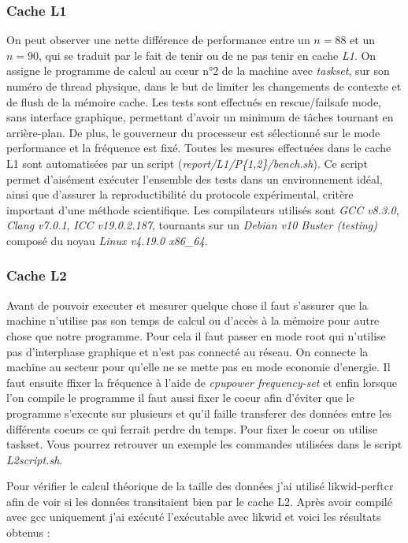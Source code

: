 \documentclass[12pt,a4paper]{article}
\begin{document}
\subsubsection{Cache L1}

On peut observer une nette différence de performance entre un $n = 88$ et un $n
= 90$, qui se traduit par le fait de tenir ou de ne pas tenir en cache
\textit{L1}. On assigne le programme de calcul au cœur n°2 de la machine avec
\textit{taskset}, sur son numéro de thread physique, dans le but de limiter les
changements de contexte et de flush de la mémoire cache. Les tests sont
effectués en rescue/failsafe mode, sans interface graphique, permettant d'avoir
un minimum de tâches tournant en arrière-plan. De plus, le gouverneur du
processeur est sélectionné sur le mode performance et la fréquence est fixé. Toutes
les mesures effectuées dans le cache L1 sont automatisées par un script
(\textit{report/L1/P\{1,2\}/bench.sh}). Ce script permet d'aisément exécuter
l'ensemble des tests dans un environnement idéal, ainsi que d'assurer la
reproductibilité du protocole expérimental, critère important d'une méthode
scientifique. Les compilateurs utilisés sont \textit{GCC v8.3.0}, \textit{Clang
v7.0.1}, \textit{ICC v19.0.2.187}, tournants sur un \textit{Debian v10 Buster
(testing)} composé du noyau \textit{Linux v4.19.0 x86\_64}.

\subsubsection{Cache L2}
Avant de pouvoir executer et mesurer quelque chose il faut s'assurer que 
la machine n'utilise pas son temps de calcul ou d'accès à la mémoire pour 
autre chose que notre programme. Pour cela il faut passer en mode root qui 
n'utilise pas d'interphase graphique et n'est pas connecté au réseau. On 
connecte la machine au secteur pour qu'elle ne se mette pas en mode economie
d'energie. Il faut ensuite ffixer la fréquence à l'aide de \textit{cpupower 
frequency-set} et enfin lorsque l'on compile le programme il faut aussi fixer
le coeur afin d'éviter que le programme s'execute sur plusieurs et qu'il 
faille transferer des données entre les différents coeurs ce qui ferrait 
perdre du temps. Pour fixer le coeur on utilise taskset. Vous pourrez retrouver
un exemple les commandes utilisées dans le script \textit{L2script.sh}.

Pour vérifier le calcul théorique de la taille des données j'ai utilisé
likwid-perftcr afin de voir si les données transitaient bien par le cache L2.
Après avoir compilé avec gcc uniquement j'ai exécuté l'exécutable avec likwid et
voici les résultats obtenus :
\end{document}
